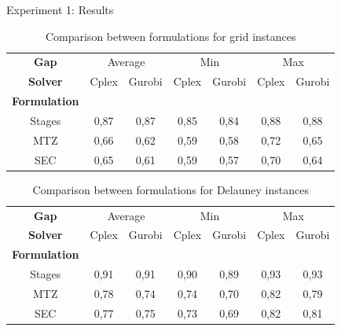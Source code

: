 \documentclass[slidestop,usepdftitle=false,10pt]{beamer}
\begin{document}
	\begin{frame}{Experiment 1: Results}
		\renewcommand{\arraystretch}{0.7}
        \begin{table}[!h]
        \caption{Comparison between formulations for grid instances}
        \centering
        \footnotesize
        \begin{tabular}{c | c c | c c | c c}
        \hline\hline
        \textbf{Gap} & \multicolumn{2}{c}{Average} &  \multicolumn{2}{c}{Min} &  \multicolumn{2}{c}{Max} \\
        \textbf{Solver} &Cplex &Gurobi &Cplex &Gurobi  &Cplex &Gurobi \\
        \hline
        \textbf{Formulation} & & & & & &\\
        Stages & 0,87 &	0,87 &	0,85 &	0,84 &	0,88 &	0,88\\
        MTZ	 & 0,66 &	0,62 &	0,59 &	0,58 &	0,72 &	0,65\\
        SEC	& 0,65 &	0,61 &	0,59 &	0,57 &	0,70 &	0,64\\
            \hline
        \end{tabular}
        \label{table:tab1}
        \end{table}
        
        \renewcommand{\arraystretch}{0.7}
        \begin{table}[!h]
        \caption{Comparison between formulations for Delauney instances}
        \centering
        \footnotesize
        \begin{tabular}{c | c c | c c | c c}
        \hline\hline
        \textbf{Gap} & \multicolumn{2}{c}{Average} &  \multicolumn{2}{c}{Min} &  \multicolumn{2}{c}{Max} \\
        \textbf{Solver} &Cplex &Gurobi &Cplex &Gurobi  &Cplex &Gurobi \\
        \hline
        \textbf{Formulation} & & & & & &\\
        Stages &	0,91 &	0,91 &	0,90 &	0,89 &	0,93 &	0,93\\
        MTZ	& 0,78 &	0,74 &	0,74 &	0,70 &	0,82 &	0,79\\
        SEC	& 0,77 &	0,75 &	0,73 &	0,69 &	0,82 &	0,81\\
            \hline
        \end{tabular}
        \label{table:tab2}
        \end{table}
	    
	\end{frame}
	
\end{document}
